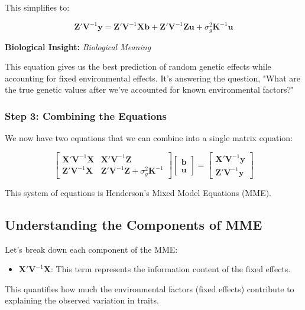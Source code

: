 \documentclass[12pt,a4paper]{article}
\newenvironment{biologicalinsightbox}[1][]
{\begin{basebox}[linecolor=uqpurple]
\textbf{\color{uqpurple}Biological Insight:} \textit{#1}\par\noindent\ignorespaces}
{\end{basebox}}
\begin{document}
This simplifies to:

\[
\mathbf{Z'} \mathbf{V}^{-1} \mathbf{y} = \mathbf{Z'} \mathbf{V}^{-1} \mathbf{Xb} + \mathbf{Z'} \mathbf{V}^{-1} \mathbf{Zu} + \sigma^2_g \mathbf{K}^{-1} \mathbf{u}
\]

\begin{biologicalinsightbox}[Biological Meaning]

This equation gives us the best prediction of random genetic effects while accounting for fixed environmental effects. It's answering the question, "What are the true genetic values after we've accounted for known environmental factors?"
\end{biologicalinsightbox}

\subsubsection{Step 3: Combining the Equations}

We now have two equations that we can combine into a single matrix equation:

\[
\begin{bmatrix}
    \mathbf{X'} \mathbf{V}^{-1} \mathbf{X} & \mathbf{X'} \mathbf{V}^{-1} \mathbf{Z} \\
    \mathbf{Z'} \mathbf{V}^{-1} \mathbf{X} & \mathbf{Z'} \mathbf{V}^{-1} \mathbf{Z} + \sigma^2_g \mathbf{K}^{-1}
\end{bmatrix}
\begin{bmatrix}
    \mathbf{b} \\
    \mathbf{u}
\end{bmatrix}
=
\begin{bmatrix}
    \mathbf{X'} \mathbf{V}^{-1} \mathbf{y} \\
    \mathbf{Z'} \mathbf{V}^{-1} \mathbf{y}
\end{bmatrix}
\]

This system of equations is Henderson's Mixed Model Equations (MME).

\subsection{Understanding the Components of MME}

Let's break down each component of the MME:

\begin{itemize}
    \item $\mathbf{X'} \mathbf{V}^{-1} \mathbf{X}$: This term represents the information content of the fixed effects.
\end{itemize}
    \begin{tcolorbox}[colback=green!5!white,colframe=uqpurple!75!black,title=Biological Interpretation]
    This quantifies how much the environmental factors (fixed effects) contribute to explaining the observed variation in traits.
    \end{tcolorbox}
\end{document}
